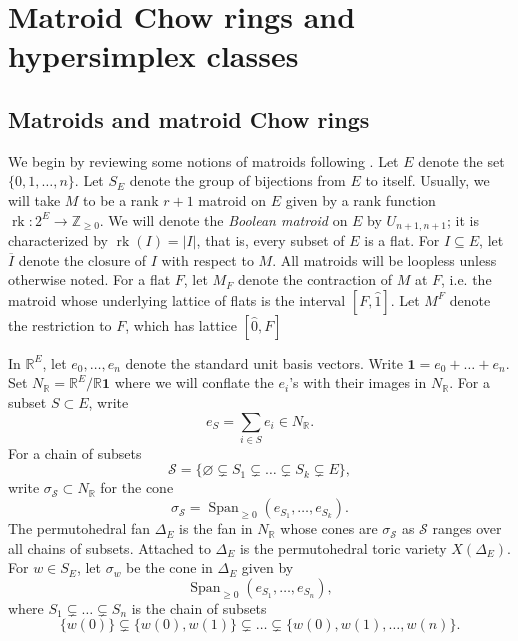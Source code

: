 \documentclass[ALCO,published]{cedram}
\numberwithin{equation}{section}
\numberwithin{figure}{section}
\newcommand{\R}{\mathbb{R}}
\newcommand{\Z}{\mathbb{Z}}
\DeclareMathOperator{\Span}{Span}
\DeclareMathOperator{\rk}{rk}
\begin{document}
\section{Matroid Chow rings and hypersimplex classes} \label{s:matroids}

\subsection{Matroids and matroid Chow rings}

We begin by reviewing some notions of matroids following \cite{AHK}.
Let $E$ denote the set $\{0,1,\dots,n\}$. Let $S_{E}$ denote the group of bijections from $E$ to itself.
Usually, we will take $M$ to be a rank $r+1$ matroid on $E$ given by a rank function $\rk\colon 2^{E}\to\Z_{\geq 0}$. 
We will denote the  {\em Boolean matroid} on $E$ by $U_{n+1,n+1}$; it is characterized by $\rk(I)=|I|$, that is, every subset of $E$ is a flat.
For $I\subseteq E$, let $\overline{I}$ denote the closure of $I$ with respect to $M$.
All matroids will be loopless unless otherwise noted. For a flat $F$, let $M_F$ denote the contraction of $M$ at $F$, i.e. the matroid whose underlying lattice of flats is the interval $[F,\hat{1}]$. Let $M^F$ denote the restriction to $F$, which has lattice $[\hat{0},F]$

In $\R^{E}$, let $e_0,\dots,e_n$ denote the standard unit basis vectors. Write $\mathbf{1}=e_0+\dots+e_n$.
Set $N_{\R}=\R^{E}/\R\mathbf{1}$ where we will conflate the $e_i$'s with their images in $N_{\R}$. For a subset $S\subset E$, write
\[e_S=\sum_{i\in S} e_i \in N_{\R}.\]
For a chain of subsets 
\[\mathcal{S}=\{\varnothing\subsetneq S_1\subsetneq \dots\subsetneq S_k\subsetneq E\},\]
write $\sigma_{\mathcal{S}}\subset N_{\R}$ for the cone
\[\sigma_{\mathcal{S}}=\Span_{\geq 0}(e_{S_1},\dots,e_{S_k}).\]
The permutohedral fan $\Delta_{E}$ is the fan in $N_{\R}$ whose cones are $\sigma_{\mathcal{S}}$ as $\mathcal{S}$ ranges over all chains of subsets.
Attached to $\Delta_{E}$ is the permutohedral toric variety $X(\Delta_{E})$.
For $w\in S_{E}$, let $\sigma_w$ be the cone in $\Delta_{E}$ given by
\[\Span_{\geq 0}(e_{S_1},\dots,e_{S_n}),\]
where $S_1\subsetneq \dots\subsetneq S_n$ is the chain of subsets
\[\{w(0)\}\subsetneq \{w(0),w(1)\}\subsetneq\dots\subsetneq \{w(0),w(1),\dots,w(n)\}.\]
\end{document}
